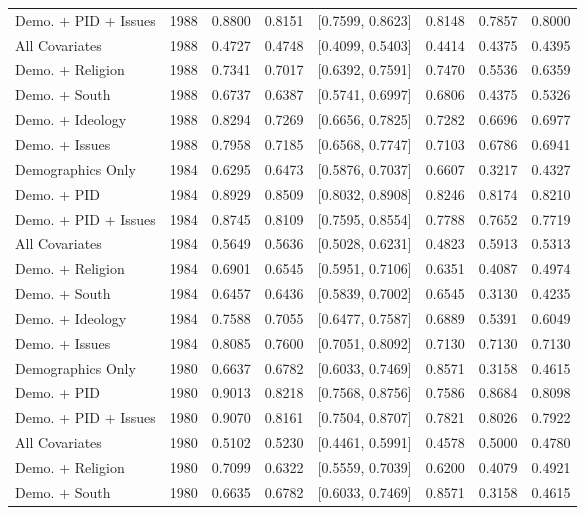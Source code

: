 \begin{longtable}{lrrrlrrr}
  Demo. + PID + Issues & 1988 & 0.8800 & 0.8151 & [0.7599, 0.8623] & 0.8148 & 0.7857 & 0.8000 \\ 
  All Covariates & 1988 & 0.4727 & 0.4748 & [0.4099, 0.5403] & 0.4414 & 0.4375 & 0.4395 \\ 
  Demo. + Religion & 1988 & 0.7341 & 0.7017 & [0.6392, 0.7591] & 0.7470 & 0.5536 & 0.6359 \\ 
  Demo. + South & 1988 & 0.6737 & 0.6387 & [0.5741, 0.6997] & 0.6806 & 0.4375 & 0.5326 \\ 
  Demo. + Ideology & 1988 & 0.8294 & 0.7269 & [0.6656, 0.7825] & 0.7282 & 0.6696 & 0.6977 \\ 
  Demo. + Issues & 1988 & 0.7958 & 0.7185 & [0.6568, 0.7747] & 0.7103 & 0.6786 & 0.6941 \\ 
  Demographics Only & 1984 & 0.6295 & 0.6473 & [0.5876, 0.7037] & 0.6607 & 0.3217 & 0.4327 \\ 
  Demo. + PID & 1984 & 0.8929 & 0.8509 & [0.8032, 0.8908] & 0.8246 & 0.8174 & 0.8210 \\ 
  Demo. + PID + Issues & 1984 & 0.8745 & 0.8109 & [0.7595, 0.8554] & 0.7788 & 0.7652 & 0.7719 \\ 
  All Covariates & 1984 & 0.5649 & 0.5636 & [0.5028, 0.6231] & 0.4823 & 0.5913 & 0.5313 \\ 
  Demo. + Religion & 1984 & 0.6901 & 0.6545 & [0.5951, 0.7106] & 0.6351 & 0.4087 & 0.4974 \\ 
  Demo. + South & 1984 & 0.6457 & 0.6436 & [0.5839, 0.7002] & 0.6545 & 0.3130 & 0.4235 \\ 
  Demo. + Ideology & 1984 & 0.7588 & 0.7055 & [0.6477, 0.7587] & 0.6889 & 0.5391 & 0.6049 \\ 
  Demo. + Issues & 1984 & 0.8085 & 0.7600 & [0.7051, 0.8092] & 0.7130 & 0.7130 & 0.7130 \\ 
  Demographics Only & 1980 & 0.6637 & 0.6782 & [0.6033, 0.7469] & 0.8571 & 0.3158 & 0.4615 \\ 
  Demo. + PID & 1980 & 0.9013 & 0.8218 & [0.7568, 0.8756] & 0.7586 & 0.8684 & 0.8098 \\ 
  Demo. + PID + Issues & 1980 & 0.9070 & 0.8161 & [0.7504, 0.8707] & 0.7821 & 0.8026 & 0.7922 \\ 
  All Covariates & 1980 & 0.5102 & 0.5230 & [0.4461, 0.5991] & 0.4578 & 0.5000 & 0.4780 \\ 
  Demo. + Religion & 1980 & 0.7099 & 0.6322 & [0.5559, 0.7039] & 0.6200 & 0.4079 & 0.4921 \\ 
  Demo. + South & 1980 & 0.6635 & 0.6782 & [0.6033, 0.7469] & 0.8571 & 0.3158 & 0.4615 \\ 

\end{longtable}
